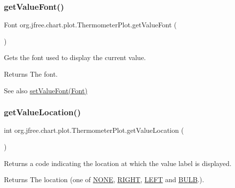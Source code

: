 \subsubsection{\texorpdfstring{get\+Value\+Font()}{getValueFont()}}
{\footnotesize\ttfamily Font org.\+jfree.\+chart.\+plot.\+Thermometer\+Plot.\+get\+Value\+Font (\begin{DoxyParamCaption}{ }\end{DoxyParamCaption})}

Gets the font used to display the current value.

\begin{DoxyReturn}{Returns}
The font.
\end{DoxyReturn}
\begin{DoxySeeAlso}{See also}
\mbox{\hyperlink{classorg_1_1jfree_1_1chart_1_1plot_1_1_thermometer_plot_afefe67cc12c7f466060e5149b699bd8a}{set\+Value\+Font(\+Font)}} 
\end{DoxySeeAlso}
\mbox{\label{classorg_1_1jfree_1_1chart_1_1plot_1_1_thermometer_plot_af9f80a7ccdea70b850b1383f078f25f0}} 
\subsubsection{\texorpdfstring{get\+Value\+Location()}{getValueLocation()}}
{\footnotesize\ttfamily int org.\+jfree.\+chart.\+plot.\+Thermometer\+Plot.\+get\+Value\+Location (\begin{DoxyParamCaption}{ }\end{DoxyParamCaption})}

Returns a code indicating the location at which the value label is displayed.

\begin{DoxyReturn}{Returns}
The location (one of \mbox{\hyperlink{classorg_1_1jfree_1_1chart_1_1plot_1_1_thermometer_plot_a5c5c2eaa1e5ec2630b9eb6e7735c4935}{N\+O\+NE}}, \mbox{\hyperlink{classorg_1_1jfree_1_1chart_1_1plot_1_1_thermometer_plot_a2010a6ea7e1a8a5b523673d169b86a5d}{R\+I\+G\+HT}}, \mbox{\hyperlink{classorg_1_1jfree_1_1chart_1_1plot_1_1_thermometer_plot_aad7899a73457ebc2310a5df7d51c626a}{L\+E\+FT}} and \mbox{\hyperlink{classorg_1_1jfree_1_1chart_1_1plot_1_1_thermometer_plot_a703245c7853327fac76511c8f223223c}{B\+U\+LB}}.). 
\end{DoxyReturn}
\mbox{\label{classorg_1_1jfree_1_1chart_1_1plot_1_1_thermometer_plot_ae4d7d0cbb2ce0a352a3855c3fa959eb4}} 
